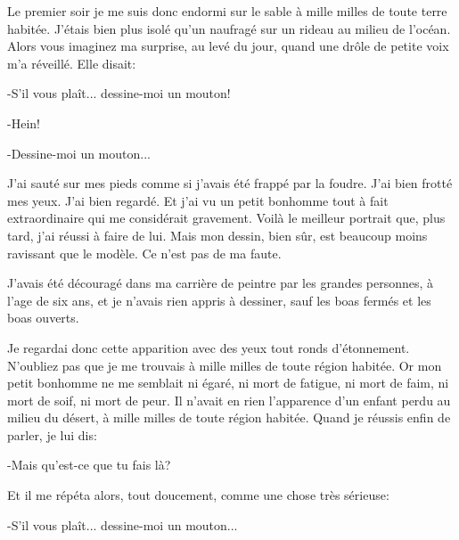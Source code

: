 \documentclass{report}
\begin{document}
Le premier soir je me suis donc endormi sur le sable à mille milles de toute terre habitée. J'étais bien plus isolé qu'un naufragé sur un rideau au milieu de l'océan. Alors vous imaginez ma surprise, au levé du jour, quand une drôle de petite voix m'a réveillé. Elle disait:

-S'il vous plaît... dessine-moi un mouton!

-Hein!

-Dessine-moi un mouton...

J'ai sauté sur mes pieds comme si j'avais été frappé par la foudre. J'ai bien frotté mes yeux. J'ai bien regardé. Et j'ai vu un petit bonhomme tout à fait extraordinaire qui me considérait gravement. Voilà le meilleur portrait que, plus tard, j'ai réussi à faire de lui. Mais mon dessin, bien sûr, est beaucoup moins ravissant que le modèle. Ce n'est pas de ma faute.

J'avais été découragé dans ma carrière de peintre par les grandes personnes, à l'age de six ans, et je n'avais rien appris à dessiner, sauf les boas fermés et les boas ouverts.


Je regardai donc cette apparition avec des yeux tout ronds d'étonnement. N'oubliez pas que je me trouvais à mille milles de toute région habitée. Or mon petit bonhomme ne me semblait ni égaré, ni mort de fatigue, ni mort de faim, ni mort de soif, ni mort de peur. Il n'avait en rien l'apparence d'un enfant perdu au milieu du désert, à mille milles de toute région habitée. Quand je réussis enfin de parler, je lui dis:

-Mais qu'est-ce que tu fais là?

Et il me répéta alors, tout doucement, comme une chose très sérieuse:

-S'il vous plaît... dessine-moi un mouton...
\end{document}
